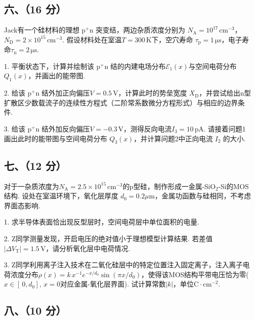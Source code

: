 \documentclass{ctexart}
\begin{document}
\vspace{5cm}

\subsection*{六、（16 分）}
Jack有一个硅材料的理想 p$^+$n 突变结，两边杂质浓度分别为 $N_{\text{A} }= 10^{17} \, \text{cm}^{-3} $，$N_{\text{D}}=2 \times 10^{15}\, \text{cm}^{-3}$. 假设材料处在室温$T = 300\, \text{K}$下，空穴寿命 $\tau_{\text{p}} =1\, \mathrm{\mu s} $，电子寿命$\tau_{\text{n}} = 2\, \mathrm{\mu s} $.\par

1. 平衡状态下，计算并绘制该 p$^+$n 结的内建电场分布$ \mathscr{E}_1 (x) $与空间电荷分布 $ Q_1 (x) $，并画出的能带图.\par
2. 给该 p$^+$n 结外加正向偏压$V = 0.5 \, \mathrm{V}$，计算此时的势垒宽度 $ X_{\text{D}}$，并尝试给出n型扩散区少数载流子的连续性方程式（二阶常系数微分方程形式）与相应的边界条件.\par
3. 给该 p$^+$n 结外加反向偏压$V = -0.3 \, \mathrm{V}$，测得反向电流$ I_3 = 10 \, \mathrm{pA}$. 请接着问题1画出此时的能带图与空间电荷分布 $ Q_3 (x) $，并计算问题2中正向电流 $ I_2 $ 的大小.\par


\newpage


\subsection*{七、（12 分）}
对于一杂质浓度为$N_\text{A} = 2.5\times10^{15} \, \text{cm}^{-3}$的p型硅，制作形成一金属-SiO$_2$-Si的MOS结构. 设处在室温环境下，氧化层厚度 $d_0=0.2\mu \text{m}$，金属功函数与硅相同，不考虑界面态影响.\par
1. 求半导体表面恰出现反型层时，空间电荷层中单位面积的电量.\par
2. Z同学测量发现，开启电压的绝对值小于理想模型计算结果. 若差值$|\Delta V_\text{T}| = 1.5\, \text{V}$，请分析氧化层中电荷情况.\par
3. Z同学利用离子注入技术在二氧化硅层中的特定位置注入固定离子，注入离子电荷浓度分布$\rho (x) = k \, x^{-1} e^{-x/d_0} \sin (\pi x/d_0)$，使得该MOS结构平带电压恰为零($x\in [\, 0, d_0],\, x=0$对应金属-氧化层界面). 试计算常数$|k|$，单位$\text{C}\cdot\text{cm}^{-2}$.\par

\vspace{7.5cm}

\subsection*{八、（10 分）}
\end{document}
